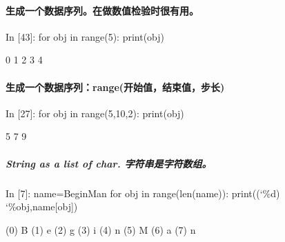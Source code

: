\documentclass[letterpaper,10pt,english]{sphinxmanual}
\def\PYGZpc{\char`\%}
\def\PYGZsq{\char`\'}
\renewcommand\PYGZsq{\textquotesingle}
\begin{document}
\paragraph{生成一个数据序列。在做数值检验时很有用。}
\label{pystart_databasic:_u751f_u6210_u4e00_u4e2a_u6570_u636e_u5e8f_u5217_u3002_u5728_u505a_u6570_u503c_u68c0_u9a8c_u65f6_u5f88_u6709_u7528_u3002}
\begin{OriginalVerbatim}[commandchars=\\\{\}]
\textcolor{nbsphinxin}{In [43]: }for obj in range(5):
             print(obj)
\end{OriginalVerbatim}
\begin{OriginalVerbatim}[commandchars=\\\{\}]
0
1
2
3
4
\end{OriginalVerbatim}

\paragraph{生成一个数据序列：range(开始值，结束值，步长)}
\label{pystart_databasic:_u751f_u6210_u4e00_u4e2a_u6570_u636e_u5e8f_u5217_uff1arange(_u5f00_u59cb_u503c_uff0c_u7ed3_u675f_u503c_uff0c_u6b65_u957f)}
\begin{OriginalVerbatim}[commandchars=\\\{\}]
\textcolor{nbsphinxin}{In [27]: }for obj in range(5,10,2):
             print(obj)
\end{OriginalVerbatim}
\begin{OriginalVerbatim}[commandchars=\\\{\}]
5
7
9
\end{OriginalVerbatim}

\subparagraph{String as a list of char. 字符串是字符数组。}
\label{pystart_databasic:String-as-a-list-of-char.-_u5b57_u7b26_u4e32_u662f_u5b57_u7b26_u6570_u7ec4_u3002}
\begin{OriginalVerbatim}[commandchars=\\\{\}]
\textcolor{nbsphinxin}{In [7]: }name=\PYGZsq{}BeginMan\PYGZsq{}
        for obj in range(len(name)):
            print(\PYGZsq{}(\PYGZpc{}d)\PYGZsq{} \PYGZpc{}obj,name[obj])
\end{OriginalVerbatim}
\begin{OriginalVerbatim}[commandchars=\\\{\}]
(0) B
(1) e
(2) g
(3) i
(4) n
(5) M
(6) a
(7) n
\end{OriginalVerbatim}
\end{document}

